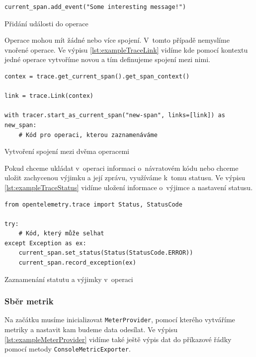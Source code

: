 \begin{listing}[H]
    \begin{verbatim}
current_span.add_event("Some interesting message!")
\end{verbatim}
    \caption{Přidání události do operace}
    \label{lst:exampleTraceEvent}
\end{listing}

Operace mohou mít žádné nebo více spojení. V~tomto případě nemyslíme vnořené operace. Ve výpisu \ref{lst:exampleTraceLink} vidíme kde pomocí kontextu jedné operace vytvoříme novou a tím definujeme spojení mezi nimi.

\begin{listing}[H]
    \begin{verbatim}
contex = trace.get_current_span().get_span_context()

link = trace.Link(contex)

with tracer.start_as_current_span("new-span", links=[link]) as new_span:
    # Kód pro operaci, kterou zaznamenáváme
\end{verbatim}
    \caption{Vytvoření spojení mezi dvěma operacemi}
    \label{lst:exampleTraceLink}
\end{listing}

Pokud chceme ukládat v~operaci informaci o~návratovém kódu nebo chceme uložit zachycenou výjimku a její zprávu, využíváme k~tomu statusu. Ve výpisu \ref{lst:exampleTraceStatus} vidíme uložení informace o~výjimce a nastavení statusu.

\begin{listing}[H]
    \begin{verbatim}
from opentelemetry.trace import Status, StatusCode
    
try:
    # Kód, který může selhat
except Exception as ex:
    current_span.set_status(Status(StatusCode.ERROR))
    current_span.record_exception(ex)
\end{verbatim}
    \caption{Zaznamenání statutu a výjimky v~operaci}
    \label{lst:exampleTraceStatus}
\end{listing}



\subsubsection{Sběr metrik}

Na začátku musíme inicializovat \texttt{MeterProvider}, pomocí kterého vytváříme metriky a nastavit kam budeme data odesílat. Ve výpisu \ref{lst:exampleMeterProvider} vidíme také ještě výpis dat do příkazové řádky pomocí metody \texttt{ConsoleMetricExporter}.

